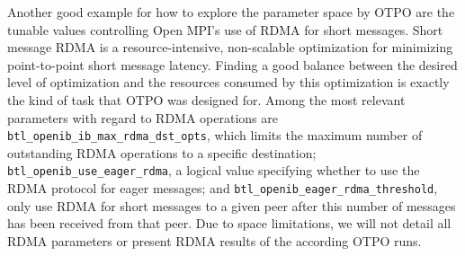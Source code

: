 Another good example for how to explore the parameter space by OTPO are the tunable values
controlling Open MPI's use of RDMA for short messages.  Short message
RDMA is a resource-intensive, non-scalable optimization for minimizing
point-to-point short message latency.  Finding a good balance between
the desired level of optimization and the resources consumed by this
optimization is exactly the kind of task that OTPO was designed for. Among the most relevant parameters with regard to RDMA operations are {\tt btl\_\-openib\_\-ib\_\-max\_\-rdma\_\-dst\_\-opts}, which limits the maximum number of outstanding RDMA operations to a specific destination; {\tt btl\_\-openib\_\-use\_\-eager\_\-rdma}, a logical value specifying whether to use the RDMA protocol for eager messages; and {\tt btl\_\-openib\_\-eager\_\-rdma\_\-threshold}, only use RDMA for short messages to a given peer after this number of messages has been received from that peer. Due to space limitations, we will not detail all RDMA parameters or present RDMA results of the according OTPO runs.

